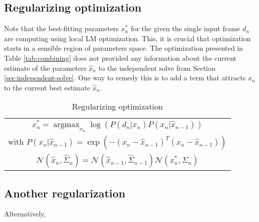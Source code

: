 \documentclass[10pt,twocolumn,letterpaper]{article}
\begin{document}
\subsection{Regularizing optimization}

Note that the best-fitting parameters $x_n^*$ for the given the single input frame $d_n$ are computing using local LM optimization. This, it is crucial that optimization starts in a sensible region of parameters space. The optimization presented in Table \ref{tab:combining} does not provided any information about the current estimate of the parameters $\hat{x}_n$ to the independent solve from Section \ref{sec:independent-solve}. One way to remedy this is to add a term that attracts $x_n$ to the current best estimate $\hat{x}_n$.

\begin{table}[!h] 
\centering
\caption{Regularizing optimization\label{tab:regularizing}} 
\begin{tabular}{|c|}
\hline

$x_n^* = \operatorname{argmax}_{x_n} \log \left( P(d_n|x_n) P(x_n |\hat{x}_{n - 1})\right)$ \\

with $P(x_n |\hat{x}_{n - 1}) = \exp \left( - (x_n - \hat{x}_{n - 1} )^T (x_n - \hat{x}_{n - 1} )\right)$ \\

$\mathcal{N}(\hat{x}_n, \hat{\Sigma}_n) = \mathcal{N}(\hat{x}_{n - 1}, \hat{\Sigma}_{n - 1}) \mathcal{N}(x_n^*, \Sigma_n)$ \\
	
\hline
\end{tabular}
\end{table}

\subsection{Another regularization}

Alternatively,
\end{document}
